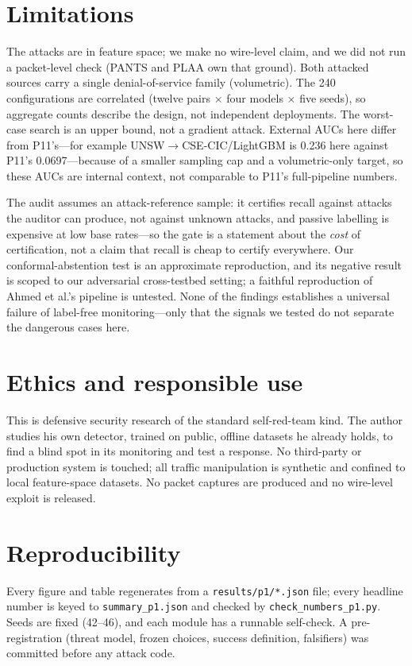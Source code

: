 \documentclass[11pt]{article}
\begin{document}
\section{Limitations}
The attacks are in feature space; we make no wire-level claim, and we did not run a packet-level check (PANTS and PLAA own that ground). Both attacked sources carry a single denial-of-service family (volumetric). The 240 configurations are correlated (twelve pairs $\times$ four models $\times$ five seeds), so aggregate counts describe the design, not independent deployments. The worst-case search is an upper bound, not a gradient attack. External AUCs here differ from P11's---for example UNSW$\to$CSE-CIC/LightGBM is 0.236 here against P11's 0.0697---because of a smaller sampling cap and a volumetric-only target, so these AUCs are internal context, not comparable to P11's full-pipeline numbers.

The audit assumes an attack-reference sample: it certifies recall against attacks the auditor can produce, not against unknown attacks, and passive labelling is expensive at low base rates---so the gate is a statement about the \emph{cost} of certification, not a claim that recall is cheap to certify everywhere. Our conformal-abstention test is an approximate reproduction, and its negative result is scoped to our adversarial cross-testbed setting; a faithful reproduction of Ahmed et al.'s pipeline is untested. None of the findings establishes a universal failure of label-free monitoring---only that the signals we tested do not separate the dangerous cases here.

\section{Ethics and responsible use}
This is defensive security research of the standard self-red-team kind. The author studies his own detector, trained on public, offline datasets he already holds, to find a blind spot in its monitoring and test a response. No third-party or production system is touched; all traffic manipulation is synthetic and confined to local feature-space datasets. No packet captures are produced and no wire-level exploit is released.

\section{Reproducibility}
Every figure and table regenerates from a \texttt{results/p1/*.json} file; every headline number is keyed to \texttt{summary\_p1.json} and checked by \texttt{check\_numbers\_p1.py}. Seeds are fixed (42--46), and each module has a runnable self-check. A pre-registration (threat model, frozen choices, success definition, falsifiers) was committed before any attack code.
\end{document}
